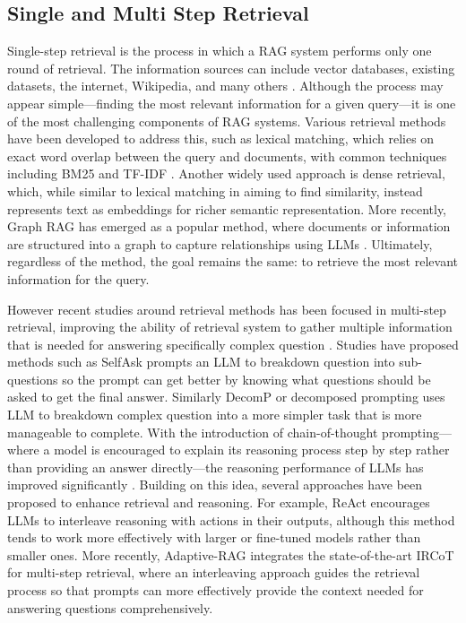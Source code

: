\documentclass[times]{iapress}
\begin{document}
\subsection{Single and Multi Step Retrieval}
Single-step retrieval is the process in which a RAG system performs only one round of retrieval. The information sources can include vector databases, existing datasets, the internet, Wikipedia, and many others \cite{multifc} \cite{internet_augmented} \cite{trillion}. Although the process may appear simple—finding the most relevant information for a given query—it is one of the most challenging components of RAG systems. Various retrieval methods have been developed to address this, such as lexical matching, which relies on exact word overlap between the query and documents, with common techniques including BM25 \cite{bm25} and TF-IDF \cite{tfidf}. Another widely used approach is dense retrieval, which, while similar to lexical matching in aiming to find similarity, instead represents text as embeddings for richer semantic representation. More recently, Graph RAG has emerged as a popular method, where documents or information are structured into a graph to capture relationships using LLMs \cite{graph_rag}. Ultimately, regardless of the method, the goal remains the same: to retrieve the most relevant information for the query.

However recent studies around retrieval methods has been focused in multi-step retrieval, improving the ability of retrieval system to gather multiple information that is needed for answering specifically complex question \cite{ircot} \cite{adaptive_rag}. Studies have proposed methods such as SelfAsk \cite{self_ask} prompts an LLM to breakdown question into sub-questions so the prompt can get better by knowing what questions should be asked to get the final answer. Similarly DecomP or decomposed prompting \cite{decompose} uses LLM to breakdown complex question into a more simpler task that is more manageable to complete. With the introduction of chain-of-thought prompting—where a model is encouraged to explain its reasoning process step by step rather than providing an answer directly—the reasoning performance of LLMs has improved significantly \cite{chain-of-thought}. Building on this idea, several approaches have been proposed to enhance retrieval and reasoning. For example, ReAct \cite{re-act} encourages LLMs to interleave reasoning with actions in their outputs, although this method tends to work more effectively with larger or fine-tuned models rather than smaller ones. More recently, Adaptive-RAG \cite{adaptive_rag} integrates the state-of-the-art IRCoT \cite{ircot} for multi-step retrieval, where an interleaving approach guides the retrieval process so that prompts can more effectively provide the context needed for answering questions comprehensively.
\end{document}
